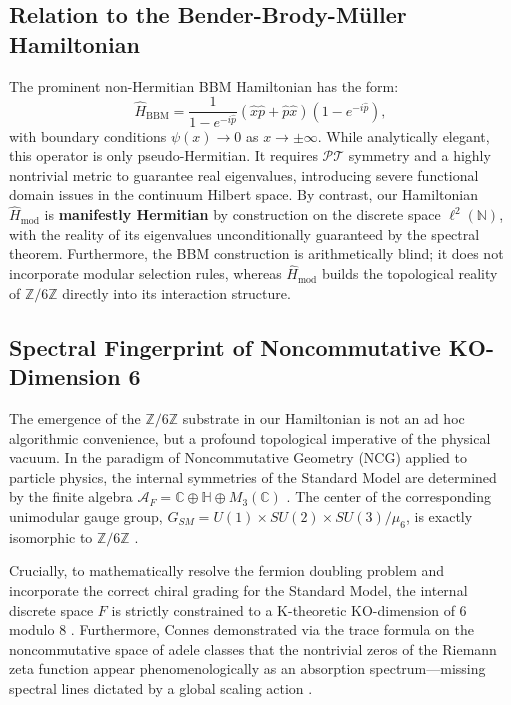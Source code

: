 \documentclass[prl,aps,floatfix,superscriptaddress,10pt]{revtex4-2}
\newcommand{\Zmod}{\mathbb{Z}/6\mathbb{Z}}
\begin{document}
\subsection{Relation to the Bender-Brody-M\"uller Hamiltonian}

The prominent non-Hermitian BBM Hamiltonian \cite{Bender2017} has the form:
\begin{equation}
\hat{H}_{\text{BBM}} = \frac{1}{1 - e^{-i\hat{p}}} (\hat{x}\hat{p} + \hat{p}\hat{x}) (1 - e^{-i\hat{p}}),
\end{equation}
with boundary conditions $\psi(x) \to 0$ as $x \to \pm\infty$. While analytically elegant, this operator is only pseudo-Hermitian. It requires $\mathcal{PT}$ symmetry and a highly nontrivial metric to guarantee real eigenvalues, introducing severe functional domain issues in the continuum Hilbert space. By contrast, our Hamiltonian $\hat{H}_{\text{mod}}$ is \textbf{manifestly Hermitian} by construction on the discrete space $\ell^2(\mathbb{N})$, with the reality of its eigenvalues unconditionally guaranteed by the spectral theorem. Furthermore, the BBM construction is arithmetically blind; it does not incorporate modular selection rules, whereas $\hat{H}_{\text{mod}}$ builds the topological reality of $\Zmod$ directly into its interaction structure.

\subsection{Spectral Fingerprint of Noncommutative KO-Dimension 6}

The emergence of the $\mathbb{Z}/6\mathbb{Z}$ substrate in our Hamiltonian is not an ad hoc algorithmic convenience, but a profound topological imperative of the physical vacuum. In the paradigm of Noncommutative Geometry (NCG) applied to particle physics, the internal symmetries of the Standard Model are determined by the finite algebra $\mathcal{A}_F = \mathbb{C} \oplus \mathbb{H} \oplus M_3(\mathbb{C})$ \cite{Chamseddine2007, Connes2008}. The center of the corresponding unimodular gauge group, $G_{SM} = U(1) \times SU(2) \times SU(3) / \mu_6$, is exactly isomorphic to $\mathbb{Z}/6\mathbb{Z}$ \cite{Connes2008}.

Crucially, to mathematically resolve the fermion doubling problem and incorporate the correct chiral grading for the Standard Model, the internal discrete space $F$ is strictly constrained to a K-theoretic KO-dimension of 6 modulo 8 \cite{Connes2008}. Furthermore, Connes demonstrated via the trace formula on the noncommutative space of adele classes that the nontrivial zeros of the Riemann zeta function appear phenomenologically as an absorption spectrum---missing spectral lines dictated by a global scaling action \cite{Connes1999}.
\end{document}
